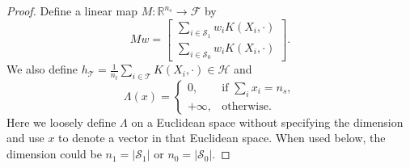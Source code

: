\documentclass[12pt]{article}
\begin{document}
\begin{proof}
	
	Define a linear map $M: \mathbb{R}^{n_s} \rightarrow \mathcal{F}$ by
	\begin{equation*}
		M w = 
		\begin{bmatrix}
			\sum_{i \in \mathcal{S}_1} w_i K(X_i, \cdot) \\
			\sum_{i \in \mathcal{S}_0} w_i K(X_i, \cdot)
		\end{bmatrix}
		.\end{equation*}
	We also define $h_\mathcal{T} = \frac{1}{n_t} \sum_{i \in \mathcal{T}} K(X_i, \cdot) \in \mathcal{H}$ and 
	\begin{equation*}
		\Lambda(x) = \begin{cases}
			0, & \text{if } \sum_{i} x_i = n_s, \\
			+\infty, & \text{otherwise.}
		\end{cases}
	\end{equation*}
	Here we loosely define $\Lambda$ on a Euclidean space without specifying the dimension and use $x$ to denote a vector in that Euclidean space. When used below, the dimension could be $n_1 = |\mathcal{S}_1|$ or $n_0 = |\mathcal{S}_0|$.
	

\end{proof}
\end{document}
